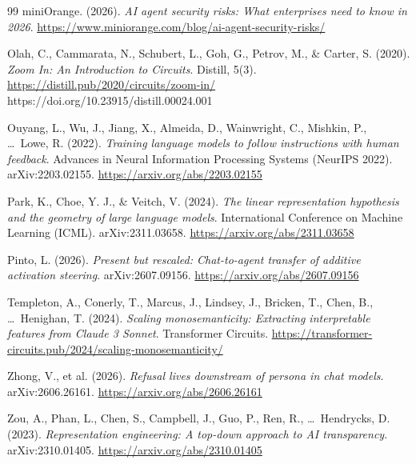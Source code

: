 \documentclass[12pt,a4paper]{article}
\begin{document}
\begin{thebibliography}{99}
miniOrange. (2026). \textit{AI agent security risks: What enterprises need to know in 2026}. \url{https://www.miniorange.com/blog/ai-agent-security-risks/}

Olah, C., Cammarata, N., Schubert, L., Goh, G., Petrov, M., \& Carter, S. (2020). \textit{Zoom In: An Introduction to Circuits}. Distill, 5(3). \url{https://distill.pub/2020/circuits/zoom-in/} \mbox{https://doi.org/10.23915/distill.00024.001}

Ouyang, L., Wu, J., Jiang, X., Almeida, D., Wainwright, C., Mishkin, P., \ldots\ Lowe, R. (2022). \textit{Training language models to follow instructions with human feedback}. Advances in Neural Information Processing Systems (NeurIPS 2022). arXiv:2203.02155. \url{https://arxiv.org/abs/2203.02155}

Park, K., Choe, Y. J., \& Veitch, V. (2024). \textit{The linear representation hypothesis and the geometry of large language models}. International Conference on Machine Learning (ICML). arXiv:2311.03658. \url{https://arxiv.org/abs/2311.03658}

Pinto, L. (2026). \textit{Present but rescaled: Chat-to-agent transfer of additive activation steering}. arXiv:2607.09156. \url{https://arxiv.org/abs/2607.09156}

Templeton, A., Conerly, T., Marcus, J., Lindsey, J., Bricken, T., Chen, B., \ldots\ Henighan, T. (2024). \textit{Scaling monosemanticity: Extracting interpretable features from Claude 3 Sonnet}. Transformer Circuits. \url{https://transformer-circuits.pub/2024/scaling-monosemanticity/}

Zhong, V., et al. (2026). \textit{Refusal lives downstream of persona in chat models}. arXiv:2606.26161. \url{https://arxiv.org/abs/2606.26161}

Zou, A., Phan, L., Chen, S., Campbell, J., Guo, P., Ren, R., \ldots\ Hendrycks, D. (2023). \textit{Representation engineering: A top-down approach to AI transparency}. arXiv:2310.01405. \url{https://arxiv.org/abs/2310.01405}

\end{thebibliography}
\end{document}
